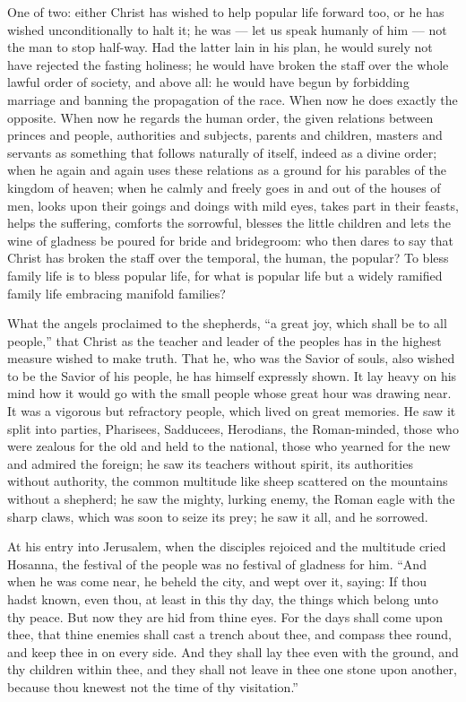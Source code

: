 \documentclass[12pt,a4paper,openany]{book}
\newcommand{\opage}[1]{\marginnote{\footnotesize\textit{[#1]}}}
\begin{document}
One of two: either Christ has wished to help popular life forward too, or he has wished unconditionally to halt it; he was --- let us speak humanly of him --- not the man to stop half-way. Had the latter lain in his plan, he would surely
\setcounter{footnote}{0}%
\opage{31}not have rejected the fasting holiness; he would have broken the staff over the whole lawful order of society, and above all: he would have begun by forbidding marriage and banning the propagation of the race. When now he does exactly the opposite. When now he regards the human order, the given relations between princes and people, authorities and subjects, parents and children, masters and servants as something that follows naturally of itself, indeed as a divine order; when he again and again uses these relations as a ground for his parables of the kingdom of heaven; when he calmly and freely goes in and out of the houses of men, looks upon their goings and doings with mild eyes, takes part in their feasts, helps the suffering, comforts the sorrowful, blesses the little children and lets the wine of gladness be poured for bride and bridegroom: who then dares to say that Christ has broken the staff over the temporal, the human, the popular? To bless family life is to bless popular life, for what is popular life but a widely ramified family life embracing manifold families?

What the angels proclaimed to the shepherds, ``a great joy, which shall be to all people,'' that Christ as the teacher and leader of the peoples has in the highest measure wished to make truth. That he, who was the Savior of souls, also wished to be the Savior of his people, he has himself expressly shown. It lay heavy on his mind how it would go with the small people whose great hour was drawing near. It was a vigorous but refractory people, which lived on great memories. He saw it split into parties, Pharisees, Sadducees, Herodians, the Roman-minded, those who were zealous for the old and
\setcounter{footnote}{0}%
\opage{32}held to the national, those who yearned for the new and admired the foreign; he saw its teachers without spirit, its authorities without authority, the common multitude like sheep scattered on the mountains without a shepherd; he saw the mighty, lurking enemy, the Roman eagle with the sharp claws, which was soon to seize its prey; he saw it all, and he sorrowed.

At his entry into Jerusalem, when the disciples rejoiced and the multitude cried Hosanna, the festival of the people was no festival of gladness for him. ``And when he was come near, he beheld the city, and wept over it, saying: If thou hadst known, even thou, at least in this thy day, the things which belong unto thy peace. But now they are hid from thine eyes. For the days shall come upon thee, that thine enemies shall cast a trench about thee, and compass thee round, and keep thee in on every side. And they shall lay thee even with the ground, and thy children within thee, and they shall not leave in thee one stone upon another, because thou knewest not the time of thy visitation.''
\end{document}
